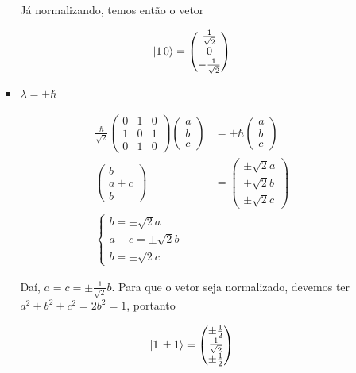 \documentclass[a4paper, 12pt, notitlepage]{article}
\begin{document}
\begin{enumerate}
\begin{enumerate}[(A)]
\begin{itemize}
     Já normalizando, temos então o vetor
     
     \[ \ket{1\,0} = \begin{pmatrix} \frac{1}{\sqrt{2}} \\ 0 \\ -\frac{1}{\sqrt{2}} \end{pmatrix} \]
     
     \item $\lambda = \pm \hbar$
     
\begin{align*}
    \frac{\hbar}{\sqrt{2}}\begin{pmatrix}
    0 & 1 & 0 \\
    1 & 0 & 1 \\
    0 & 1 & 0
    \end{pmatrix}
    \begin{pmatrix}
    a \\ b \\ c
    \end{pmatrix} &= \pm \hbar \begin{pmatrix} a \\ b \\ c \end{pmatrix} \\
    \begin{pmatrix}
    b \\ a + c \\ b
    \end{pmatrix} &= \begin{pmatrix}
    \pm \sqrt{2} a \\ \pm \sqrt{2} b\\ \pm \sqrt{2} c
    \end{pmatrix} \\
    \begin{cases}
    b = \pm\sqrt{2} a \\
    a+c = \pm \sqrt{2} b \\
    b = \pm \sqrt{2} c
    \end{cases}
\end{align*}
    
    Daí, $a = c = \pm \frac{1}{\sqrt{2}} b$. Para que o vetor seja normalizado, devemos ter $a^2 + b^2 + c^2 = 2b^2 = 1$, portanto
    
    \[ 
    \ket{1\,\pm 1} = \begin{pmatrix} 
    \pm\frac{1}{2} \\
    \frac{1}{\sqrt{2}} \\
    \pm\frac{1}{2}
    \end{pmatrix}
    \]
    

\end{itemize}
\end{enumerate}
\end{enumerate}
\end{document}
